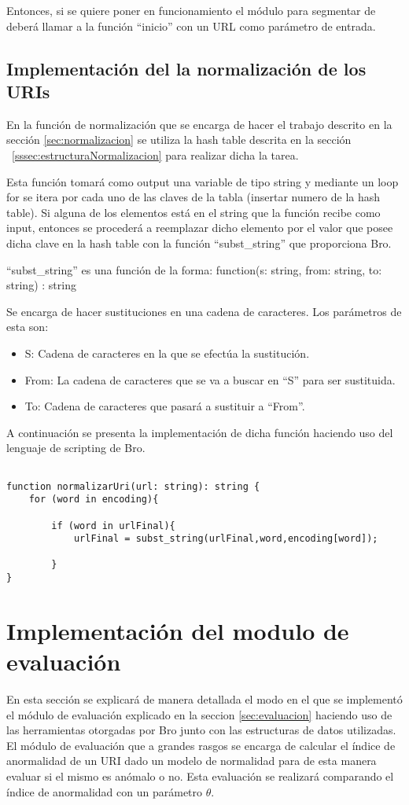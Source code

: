     Entonces, si se quiere poner en funcionamiento el módulo para segmentar de deberá llamar a la función “inicio” con un URL como parámetro de entrada.

\subsection{Implementación del la normalización de los URIs}

En la función de normalización que se encarga de hacer el trabajo descrito en la sección \ref{sec:normalizacion} se utiliza la hash table descrita en la sección ~\ref{sssec:estructuraNormalizacion} para realizar dicha la tarea.

Esta función tomará como output una variable de tipo string y mediante un loop for se itera por cada uno de las claves de la tabla (insertar numero de la hash table). Si alguna de los elementos está en el string que la función recibe como input, entonces se procederá a reemplazar dicho elemento por el valor que posee dicha clave en la hash table con la función “subst\_string” que proporciona Bro.

“subst\_string” es una función de la forma: function(s: string, from: string, to: string) : string

Se encarga de hacer sustituciones en una cadena de caracteres. Los parámetros de esta son:

\begin{itemize}
\item S: Cadena de caracteres en la que se efectúa la sustitución.
\item From: La cadena de caracteres que se va a buscar en “S” para ser sustituida.
\item To: Cadena de caracteres que pasará a sustituir a “From”.
\end{itemize}

A continuación se presenta la implementación de dicha función haciendo uso del lenguaje de scripting de Bro.

\begin{verbatim}

function normalizarUri(url: string): string {
    for (word in encoding){

        if (word in urlFinal){
            urlFinal = subst_string(urlFinal,word,encoding[word]);

        }
}
\end{verbatim}
        
\section{Implementación del modulo de evaluación}
En esta sección se explicará de manera detallada el modo en el que se implementó el módulo de evaluación explicado en la seccion \ref{sec:evaluacion}  haciendo uso de las herramientas otorgadas por Bro junto con las estructuras de datos utilizadas. El módulo de evaluación que a grandes rasgos se encarga de calcular el índice de anormalidad de un URI dado un modelo de normalidad para de esta manera evaluar si el mismo es anómalo o no. Esta evaluación se realizará comparando el índice de anormalidad con un parámetro $\theta$.

